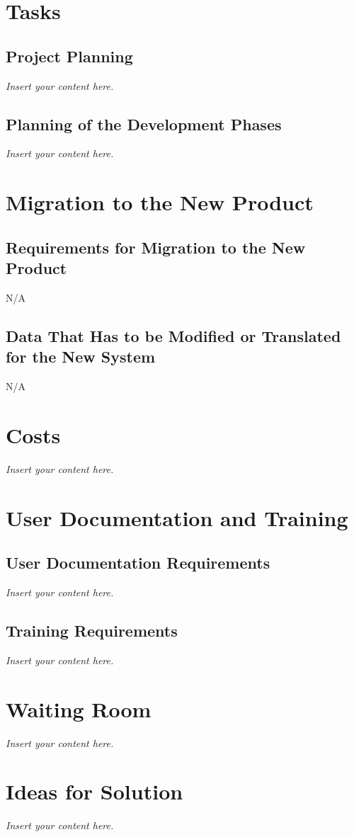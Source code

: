 \documentclass[12pt]{article}
\newcommand{\lips}{\textit{Insert your content here.}}
\begin{document}
\section{Tasks}
\subsection{Project Planning}
\lips
\subsection{Planning of the Development Phases}
\lips

\section{Migration to the New Product}
\subsection{Requirements for Migration to the New Product}
N/A
\subsection{Data That Has to be Modified or Translated for the New System}
N/A

\section{Costs}
\lips
\section{User Documentation and Training}
\subsection{User Documentation Requirements}
\lips
\subsection{Training Requirements}
\lips

\section{Waiting Room}
\lips

\section{Ideas for Solution}
\lips
\end{document}
